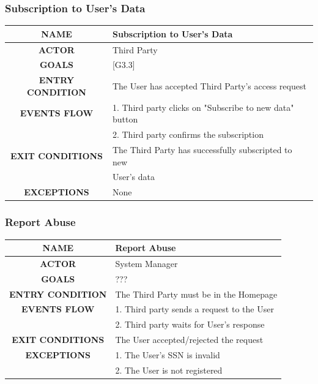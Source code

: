 \documentclass[12pt,a4paper]{article}
\begin{document}
		\subsubsection{Subscription to User's Data}
		\begin{center}
			\begin{tabular}{| c | l |}
				\hline
				\textbf{NAME} & Subscription to User's Data \\
				\hline
				\textbf{ACTOR} & Third Party \\
				\hline
				\textbf{GOALS} & [G3.3] \\
				\hline
				\textbf{ENTRY CONDITION} & The User has accepted Third Party's access request \\ \hline
				\textbf{EVENTS FLOW}  &
				1. Third party clicks on "Subscribe to new data" button\\
				&2. Third party confirms the subscription\\
				\hline
				\textbf{EXIT CONDITIONS}  & The Third Party has successfully subscripted to new\\
				& User's data \\ \hline
				\textbf{EXCEPTIONS} &
				None\\
				\hline
			\end{tabular}
		\end{center}

		\subsubsection{Report Abuse}
		\begin{center}
			\begin{tabular}{| c | l |}
				\hline
				\textbf{NAME} & Report Abuse \\
				\hline
				\textbf{ACTOR} & System Manager \\
				\hline
				\textbf{GOALS} & ??? \\
				\hline
				\textbf{ENTRY CONDITION} & The Third Party must be in the Homepage \\ \hline
				\textbf{EVENTS FLOW}  &
				1. Third party sends a request to the User\\
				&2. Third party waits for User's response\\
				\hline
				\textbf{EXIT CONDITIONS}  & The User accepted/rejected the request \\ \hline
				\textbf{EXCEPTIONS} &
				1. The User's SSN is invalid\\
				&2. The User is not registered\\
				\hline
			\end{tabular}
		\end{center}
\end{document}
